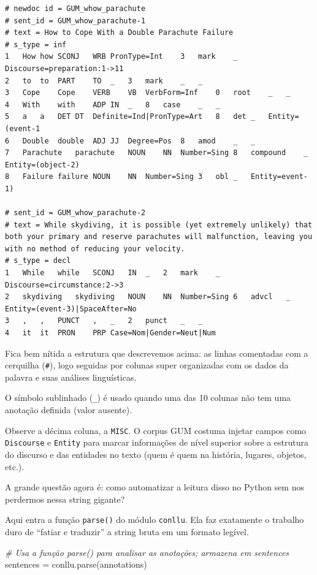 \documentclass[
  brazilian,
]{article}
\newenvironment{Shaded}{}{}
\newcommand{\CommentTok}[1]{\textcolor[rgb]{0.38,0.63,0.69}{\textit{#1}}}
\newcommand{\NormalTok}[1]{#1}
\newcommand{\OperatorTok}[1]{\textcolor[rgb]{0.40,0.40,0.40}{#1}}
\begin{document}
\begin{verbatim}
# newdoc id = GUM_whow_parachute
# sent_id = GUM_whow_parachute-1
# text = How to Cope With a Double Parachute Failure
# s_type = inf
1   How how SCONJ   WRB PronType=Int    3   mark    _   Discourse=preparation:1->11
2   to  to  PART    TO  _   3   mark    _   _
3   Cope    Cope    VERB    VB  VerbForm=Inf    0   root    _   _
4   With    with    ADP IN  _   8   case    _   _
5   a   a   DET DT  Definite=Ind|PronType=Art   8   det _   Entity=(event-1
6   Double  double  ADJ JJ  Degree=Pos  8   amod    _   _
7   Parachute   parachute   NOUN    NN  Number=Sing 8   compound    _   Entity=(object-2)
8   Failure failure NOUN    NN  Number=Sing 3   obl _   Entity=event-1)

# sent_id = GUM_whow_parachute-2
# text = While skydiving, it is possible (yet extremely unlikely) that both your primary and reserve parachutes will malfunction, leaving you with no method of reducing your velocity.
# s_type = decl
1   While   while   SCONJ   IN  _   2   mark    _   Discourse=circumstance:2->3
2   skydiving   skydiving   NOUN    NN  Number=Sing 6   advcl   _   Entity=(event-3)|SpaceAfter=No
3   ,   ,   PUNCT   ,   _   2   punct   _   _
4   it  it  PRON    PRP Case=Nom|Gender=Neut|Num
\end{verbatim}

Fica bem nítida a estrutura que descrevemos acima: as linhas comentadas
com a cerquilha (\texttt{\#}), logo seguidas por colunas super
organizadas com os dados da palavra e suas análises linguísticas.

O símbolo sublinhado (\texttt{\_}) é usado quando uma das 10 colunas não
tem uma anotação definida (valor ausente).

Observe a décima coluna, a \texttt{MISC}. O corpus GUM costuma injetar
campos como \texttt{Discourse} e \texttt{Entity} para marcar informações
de nível superior sobre a estrutura do discurso e das entidades no texto
(quem é quem na história, lugares, objetos, etc.).

A grande questão agora é: como automatizar a leitura disso no Python sem
nos perdermos nessa string gigante?

Aqui entra a função \texttt{parse()} do módulo \texttt{conllu}. Ela faz
exatamente o trabalho duro de ``fatiar e traduzir'' a string bruta em um
formato legível.

\begin{Shaded}
\begin{Highlighting}[]
\CommentTok{\# Usa a função parse() para analisar as anotações; armazena em \textquotesingle{}sentences\textquotesingle{}}
\NormalTok{sentences }\OperatorTok{=}\NormalTok{ conllu.parse(annotations)}
\end{Highlighting}
\end{Shaded}
\end{document}
